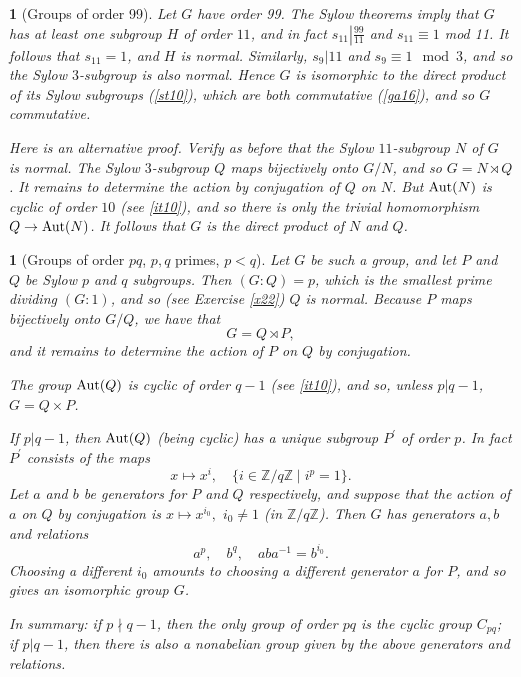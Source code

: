 \documentclass[a4paper,11pt,final]{memoir}%
\newtheorem{plain}[X]{}
\theoremstyle{nonumberplain}
\begin{document}
\begin{plain}
[Groups of order 99]\label{st12}%
%
Let $G$ have order 99. The Sylow theorems imply that $G$ has at least one
subgroup $H$ of order $11$, and in fact $s_{11}\left\vert \frac{99}%
{11}\right.  $ and $s_{11}\equiv1$ mod 11. It follows that $s_{11}=1$, and $H$
is normal. Similarly, $s_{9}|11$ and $s_{9}\equiv1\mod3$, and so the Sylow
$3$-subgroup is also normal. Hence $G$ is isomorphic to the direct product of
its Sylow subgroups (\ref{st10}), which are both commutative (\ref{ga16}), and
so $G$ commutative.

Here is an alternative proof. Verify as before that the Sylow $11$-subgroup
$N$ of $G$ is normal. The Sylow $3$-subgroup $Q$ maps bijectively onto $G/N$,
and so $G=N\rtimes Q$. It remains to determine the action by conjugation of
$Q$ on $N$. But $\operatorname{Aut}(N)$ is cyclic of order $10$ (see \ref{it10}), and so
there is only the trivial homomorphism $Q\rightarrow\operatorname{Aut}(N)$. It follows that
$G$ is the direct product of $N$ and $Q$.
\end{plain}

\begin{plain}
[Groups of order $pq$, $p,q$ primes, $p<q$]\label{st13}%
%
Let $G$ be such a group, and let $P$ and $Q$ be Sylow $p$ and $q$ subgroups.
Then $(G:Q)=p$, which is the smallest prime dividing $(G:1)$, and so (see
Exercise \ref{x22}) $Q$ is normal. Because $P$ maps bijectively onto $G/Q$, we
have that
\[
G=Q\rtimes P,
\]
and it remains to determine the action of $P$ on $Q$ by conjugation.

The group $\operatorname{Aut}(Q)$ is cyclic of order $q-1$ (see \ref{it10}), and so, unless
$p|q-1$, $G=Q\times P$.

If $p|q-1$, then $\operatorname{Aut}(Q)$ (being cyclic) has a unique subgroup $P^{\prime}$
of order $p$. In fact $P^{\prime}$ consists of the maps
\[
x\mapsto x^{i},\quad\{i\in\mathbb{\mathbb{Z}{}}/q\mathbb{Z}{}\mid i^{p}=1\}.
\]
Let $a$ and $b$ be generators for $P$ and $Q$ respectively, and suppose that
the action of $a$ on $Q$ by conjugation is $x\mapsto x^{i_{0}},$ $i_{0}\neq1$
(in $\mathbb{\mathbb{Z}{}}/q\mathbb{Z}$). Then $G$ has generators $a,b$ and
relations
\[
a^{p},\quad b^{q},\quad aba^{-1}=b^{i_{0}}.
\]
Choosing a different $i_{0}$ amounts to choosing a different generator $a$ for
$P$, and so gives an isomorphic group $G$.

In summary: if $p\nmid q-1$, then the only group of order $pq$ is the cyclic
group $C_{pq}$; if $p|q-1$, then there is also a nonabelian group given by the
above generators and relations.
\end{plain}
\end{document}
